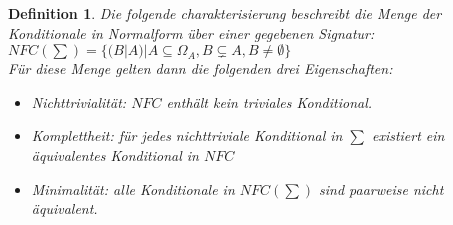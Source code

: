 \documentclass[12pt,a4paper]{article}
\newtheorem{theorem}{Definition}
\begin{document}
\begin{theorem}
Die folgende charakterisierung beschreibt die Menge der Konditionale in Normalform über einer gegebenen Signatur: \\
$NFC(\sum) = \{(B|A)|A \subseteq \Omega_A, B \subsetneq A, B \neq \emptyset \}$ \\
Für diese Menge gelten dann die folgenden drei Eigenschaften:\
 \begin{itemize}
\item{Nichttrivialität: $NFC$ enthält kein triviales Konditional.}
\item{Komplettheit: für jedes nichttriviale Konditional in $\sum$ existiert ein äquivalentes Konditional in $NFC$ }
\item{Minimalität: alle Konditionale in $NFC(\sum)$ sind paarweise nicht äquivalent.}
\end{itemize}
\end{theorem}
\end{document}

